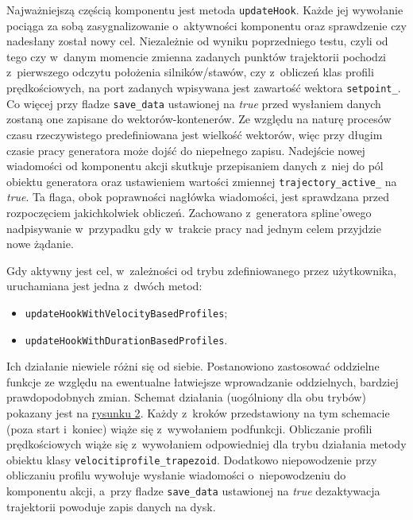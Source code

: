 \documentclass[a4paper, 12pt]{article}
\begin{document}
	\par Najważniejszą częścią komponentu jest metoda \texttt{updateHook}. Każde jej wywołanie pociąga za sobą zasygnalizowanie o~aktywności komponentu oraz sprawdzenie czy nadesłany został nowy cel. Niezależnie od wyniku poprzedniego testu, czyli od tego czy w~danym momencie zmienna zadanych punktów trajektorii pochodzi z~pierwszego odczytu położenia silników/stawów, czy z~obliczeń klas profili prędkościowych, na port zadanych wpisywana jest zawartość wektora \texttt{setpoint\_}. Co więcej przy fladze \texttt{save\_data} ustawionej na \textit{true} przed wysłaniem danych zostaną one zapisane do wektorów-kontenerów. Ze względu na naturę procesów czasu rzeczywistego predefiniowana jest wielkość wektorów, więc przy długim czasie pracy generatora może dojść do niepełnego zapisu. Nadejście nowej wiadomości od komponentu akcji skutkuje przepisaniem danych z~niej do pól obiektu generatora oraz ustawieniem wartości zmiennej \texttt{trajectory\_active\_} na \textit{true}. Ta flaga, obok poprawności nagłówka wiadomości, jest sprawdzana przed rozpoczęciem jakichkolwiek obliczeń. Zachowano z~generatora spline'owego nadpisywanie w~przypadku gdy w~trakcie pracy nad jednym celem przyjdzie nowe żądanie. 
	\par Gdy aktywny jest cel, w~zależności od trybu zdefiniowanego przez użytkownika, uruchamiana jest jedna z~dwóch metod:
	\begin{itemize}
	\item \texttt{updateHookWithVelocityBasedProfiles};
	\item \texttt{updateHookWithDurationBasedProfiles}.
	\end{itemize}
	Ich działanie niewiele różni się od siebie. Postanowiono zastosować oddzielne funkcje ze względu na ewentualne łatwiejsze wprowadzanie oddzielnych, bardziej prawdopodobnych zmian. Schemat działania (uogólniony dla obu trybów) pokazany jest na \hyperref[uHD]{rysunku 2}. Każdy z~kroków przedstawiony na tym schemacie (poza start i~koniec) wiąże się z~wywołaniem podfunkcji. Obliczanie profili prędkościowych wiąże się z~wywołaniem odpowiedniej dla trybu działania metody obiektu klasy \texttt{velocitiprofile\_trapezoid}. Dodatkowo niepowodzenie przy obliczaniu profilu wywołuje wysłanie wiadomości o~niepowodzeniu do komponentu akcji, a~przy fladze \texttt{save\_data} ustawionej na \textit{true} dezaktywacja trajektorii powoduje zapis danych na dysk.
\end{document}

